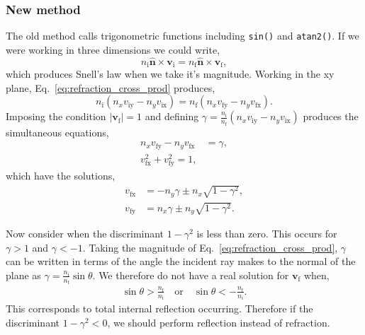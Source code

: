 \documentclass{article}
\let\vec \bm
\newcommand{\mrm}[1]{\mathrm{#1}}
\begin{document}
\subsubsection{New method}
The old method calls trigonometric functions including \texttt{sin()} and \texttt{atan2()}. If we were working in three dimensions we could write,
\begin{equation}
\label{eq:refraction_cross_prod}
    n_\mrm{i} \vec{\hat n} \times \vec{v}_\mrm{i} = n_\mrm{f} \vec{\hat n} \times \vec{v}_\mrm{f},
\end{equation}
which produces Snell's law when we take it's magnitude. Working in the xy plane, Eq.~\ref{eq:refraction_cross_prod} produces,
\begin{equation}
    n_\mrm{i} (n_x v_\mrm{iy} - n_y v_\mrm{ix})
    =
    n_\mrm{f} (n_x v_\mrm{fy} - n_y v_\mrm{fx}).
\end{equation}
Imposing the condition $|\vec{v}_\mrm{f}| = 1$ and defining $\gamma = \frac{n_\mrm{i}}{n_\mrm{f}} (n_x v_\mrm{iy} - n_y v_\mrm{ix})$ produces the simultaneous equations,
\begin{align}
    n_x v_\mrm{fy} - n_y v_\mrm{fx}
    &=
    \gamma, \\
    v_\mrm{fx}^2 + v_\mrm{fy}^2 = 1,
\end{align}
which have the solutions,
\begin{align}
\label{eq:refr_v_x}
    v_\mrm{fx} &= -n_y \gamma \pm n_x \sqrt{1-\gamma^2}, \\
\label{eq:refr_v_y}
    v_\mrm{fy} &= n_x \gamma \pm n_y \sqrt{1-\gamma^2}.
\end{align}

Now consider when the discriminant $1 - \gamma^2$ is less than zero. This occurs for $\gamma > 1$ and $\gamma < -1$. Taking the magnitude of Eq.~\ref{eq:refraction_cross_prod}, $\gamma$ can be written in terms of the angle the incident ray makes to the normal of the plane as $\gamma = \frac{n_\mrm{i}}{n_\mrm{f}} \sin \theta$. We therefore do not have a real solution for $\vec{v}_\mrm{f}$ when,
\begin{align}
    \sin \theta > \frac{n_\mrm{f}}{n_\mrm{i}} \quad \mathrm{or} \quad \sin \theta < -\frac{n_\mrm{f}}{n_\mrm{i}}.
\end{align}
This corresponds to total internal reflection occurring. Therefore if the discriminant $1 - \gamma^2 < 0$, we should perform reflection instead of refraction.
\end{document}
